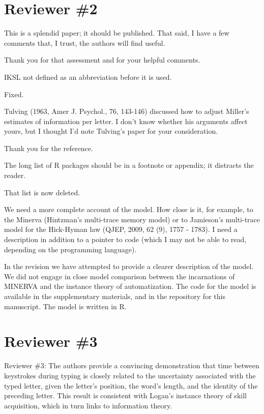 \documentclass[draft]{article}
\begin{document}
\hypertarget{reviewer-2}{%
\section{Reviewer \#2}\label{reviewer-2}}

\RC This is a splendid paper; it should be published. That said, I have a few comments that, I trust, the authors will find useful.

Thank you for that assessment and for your helpful comments.

\RC IKSL not defined as an abbreviation before it is used.

Fixed.

\RC Tulving (1963, Amer J. Psychol., 76, 143-146) discussed how to adjust Miller's estimates of information per letter. I don't know whether his arguments affect yours, but I thought I'd note Tulving's paper for your consideration.

Thank you for the reference.

\RC The long list of R packages should be in a footnote or appendix; it distracts the reader.

That list is now deleted.

\RC We need a more complete account of the model. How close is it, for example, to the Minerva (Hintzman's multi-trace memory model) or to Jamieson's multi-trace model for the Hick-Hyman law (QJEP, 2009, 62 (9), 1757 - 1783). I need a description in addition to a pointer to code (which I may not be able to read, depending on the programming language).

In the revision we have attempted to provide a clearer description of the model. We did not engage in close model comparison between the incarnations of MINERVA and the instance theory of automatization. The code for the model is available in the supplementary materials, and in the repository for this manuscript. The model is written in R.

\hypertarget{reviewer-3}{%
\section{Reviewer \#3}\label{reviewer-3}}

Reviewer \#3: The authors provide a convincing demonstration that time between keystrokes during typing is closely related to the uncertainty associated with the typed letter, given the letter's position, the word's length, and the identity of the preceding letter. This result is consistent with Logan's instance theory of skill acquisition, which in turn links to information theory.
\end{document}
